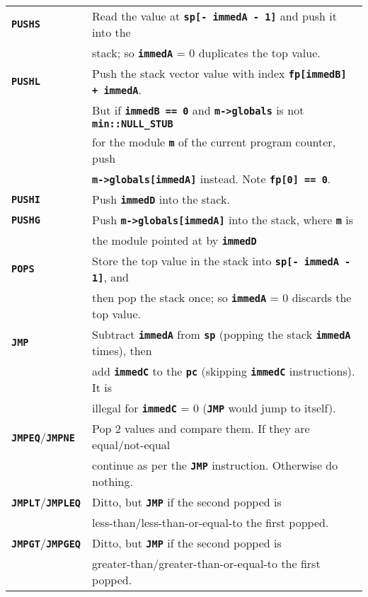 \documentclass[12pt]{article}
\makeatletter
\newcommand{\TT}[1]{{\tt \bfseries #1}}
\newcommand{\ttkey}[1]{\TT{#1}\index{#1@{\tt #1}}}
\newlength{\figurewidth}
\newenvironment{boxedfigure}[1][!btp]%
	{\begin{figure*}[#1]
	 \begin{lrbox}{\figurebox}
	 \begin{minipage}{\figurewidth}

	 \vspace*{1ex}}%
	{
	 \vspace*{1ex}

	 \end{minipage}
	 \end{lrbox}

	 \centering
	 \fbox{\hspace*{0.1in}\usebox{\figurebox}\hspace*{0.1in}}
	 \end{figure*}}
\makeatother
\begin{document}
\begin{boxedfigure}

\begin{center}
\begin{tabular}{|l|l|}
\hline
\ttkey{PUSHS}
    & Read the value at \TT{sp[- immedA - 1]} and push it into the \\
    & stack; so \TT{immedA} = 0 duplicates the top value.
\\\hline
\ttkey{PUSHL}
    & Push the stack vector value with index \TT{fp[immedB] + immedA}. \\
    & But if \TT{immedB == 0} and \TT{m->globals} is not \TT{min::NULL\_STUB} \\
    & for the module \TT{m} of the current program counter, push \\
    & \TT{m->globals[immedA]} instead.  Note \TT{fp[0] == 0}.
\\\hline
\ttkey{PUSHI}
    & Push \TT{immedD} into the stack.
\\\hline
\ttkey{PUSHG}
    & Push \TT{m->globals[immedA]} into the stack, where \TT{m} is \\
    & the module pointed at by \TT{immedD}
\\\hline
\ttkey{POPS}
    & Store the top value in the stack into \TT{sp[- immedA - 1]}, and \\
    & then pop the stack once; so \TT{immedA} = 0 discards the top value.
\\\hline
\ttkey{JMP}
    & Subtract \TT{immedA} from \TT{sp} (popping the stack \TT{immedA} times),
      then \\
    & add \TT{immedC} to the \TT{pc} (skipping \TT{immedC} instructions).
      It is \\
    & illegal for \TT{immedC} = 0 (\TT{JMP} would jump to itself).
\\\hline
\ttkey{JMPEQ}/\ttkey{JMPNE}
    & Pop 2 values and compare them.  If they are equal/not-equal \\
    & continue as per the \TT{JMP} instruction.  Otherwise do nothing.
\\\hline
\ttkey{JMPLT}/\ttkey{JMPLEQ}
    & Ditto, but \TT{JMP} if the second popped is \\
    & less-than/less-than-or-equal-to the first popped.
\\\hline
\ttkey{JMPGT}/\ttkey{JMPGEQ}
    & Ditto, but \TT{JMP} if the second popped is \\
    & greater-than/greater-than-or-equal-to the first popped.
\\\hline

\end{tabular}
\end{center}
\end{boxedfigure}
\end{document}
